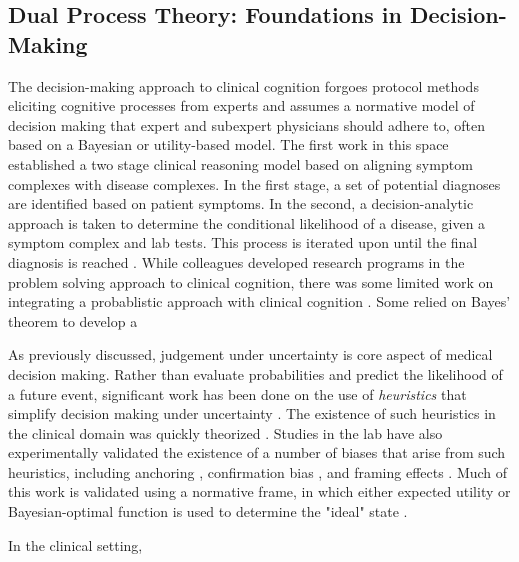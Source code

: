 \subsection{Dual Process Theory: Foundations in Decision-Making}
The decision-making approach to clinical cognition forgoes protocol methods eliciting cognitive processes from experts and assumes a normative model of decision making that expert and subexpert physicians should adhere to, often based on a Bayesian or utility-based model. The first work in this space established a two stage clinical reasoning model based on aligning symptom complexes with disease complexes. In the first stage, a set of potential diagnoses are identified based on patient symptoms. In the second, a decision-analytic approach is taken to determine the conditional likelihood of a disease, given a symptom complex and lab tests. This process is iterated upon until the final diagnosis is reached \citep{ledley1959reasoning}. While colleagues developed research programs in the problem solving approach to clinical cognition, there was some limited work on integrating a probablistic approach with clinical cognition \citep{blois, OTHER}. Some relied on Bayes' theorem to develop a 



As previously discussed, judgement under uncertainty is core aspect of medical decision making. Rather than evaluate probabilities and predict the likelihood of a future event, significant work has been done on the use of \emph{heuristics} that simplify decision making under uncertainty \citep{tverskyJudgmentUncertaintyHeuristics1974a}. The existence of such heuristics in the clinical domain was quickly theorized \cite{eddyProbabilisticReasoningClinical1982}. Studies in the lab have also experimentally validated the existence of a number of biases that arise from such heuristics, including anchoring \citep{friedlanderAnchoringPublicityEffects1983}, confirmation bias \citep{klaymanDebiasEnvironmentInstead1993}, and framing effects \citep{mcneilElicitationPreferencesAlternative1982}. Much of this work is validated using a normative frame, in which either expected utility or Bayesian-optimal function is used to determine the "ideal" state \citep{camererProcessperformanceParadoxExpert1991}. 

In the clinical setting, 




